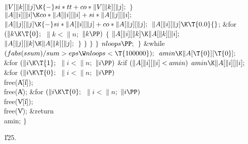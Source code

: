 ${}\|V[\|k][\|j]\K{-}\\{si}*\\{tt}+\\{co}*\|V[\|k][\|j];{}$\6
\4${}\}{}$\2\6
${}\|A[\|i][\|i]\K\\{co}*\|A[\|i][\|i]+\\{si}*\|A[\|j][\|i];{}$\6
${}\|A[\|j][\|j]\K{-}\\{si}*\|A[\|i][\|j]+\\{co}*\|A[\|j][\|j];{}$\6
${}\|A[\|i][\|j]\K\T{0.0}{}$;\6
\&{for} ${}(\|k\K\T{0};{}$ ${}\|k<\|n;{}$ ${}\|k\PP){}$\5
${}\{{}$\1\6
${}\|A[\|i][\|k]\K\|A[\|k][\|i];{}$\6
${}\|A[\|j][\|k]\K\|A[\|k][\|j];{}$\6
\4${}\}{}$\2\6
\4${}\}{}$\2\6
\4${}\}{}$\2\6
\4${}\}{}$\2\6
${}\\{nloops}\PP;{}$\6
\4${}\}{}$\2\5
\&{while} ${}(\\{fabs}(\\{ssum})/\\{sum}>\\{eps}\W\\{nloops}<\T{100000});{}$\6
${}\\{amin}\K\|A[\T{0}][\T{0}];{}$\6
\&{for} ${}(\|i\K\T{1};{}$ ${}\|i<\|n;{}$ ${}\|i\PP){}$\1\6
\&{if} ${}(\|A[\|i][\|i]<\\{amin}){}$\1\5
${}\\{amin}\K\|A[\|i][\|i];{}$\2\2\6
\&{for} ${}(\|i\K\T{0};{}$ ${}\|i<\|n;{}$ ${}\|i\PP){}$\1\5
\\{free}(\|A[\|i]);\2\6
\\{free}(\|A);\6
\&{for} ${}(\|i\K\T{0};{}$ ${}\|i<\|n;{}$ ${}\|i\PP){}$\1\5
\\{free}(\|V[\|i]);\2\6
\\{free}(\|V);\6
\&{return} \\{amin};\6
\4${}\}{}$\2\par
\U125.\fi

